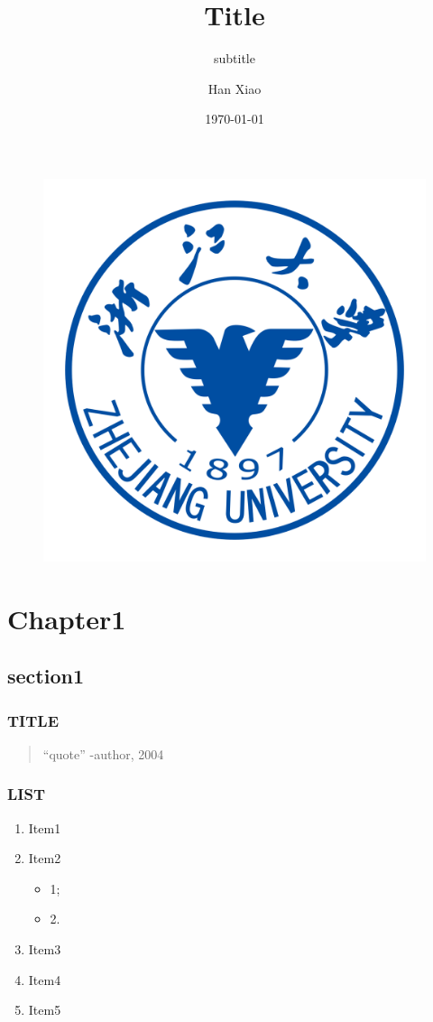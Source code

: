 \documentclass[xcolor=svgnames]{beamer}
\title{Title}
\subtitle{subtitle}
\author{Han Xiao}
\institute{ISEE, Zhejiang University} %
\date{\today}
\begin{document}
\begin{frame}
\begin{figure}
\centering
\includegraphics[width=0.15\linewidth]{ZJU_LOGO.png}
\end{figure}
  \titlepage

\end{frame}

\section[Outline]{}
\frame {
    \frametitle{\secname}
    \tableofcontents
  }


\section{Chapter1}
\subsection{section1}
\begin{frame}[fragile]
  \frametitle{TITLE}
  \begin{quote}
    ``quote''
    \vfill -author, 2004
  \end{quote}
\end{frame}


\begin{frame}[fragile]
  \frametitle{LIST}

  \begin{enumerate}
    \item<1-> Item1
    \item<2-> Item2
      \begin{itemize}
        \item 1;
        \item 2.
      \end{itemize}
    \item<3-> Item3
    \item<4-> Item4
    \item<5-> Item5
  \end{enumerate}
\end{frame}
\end{document}
